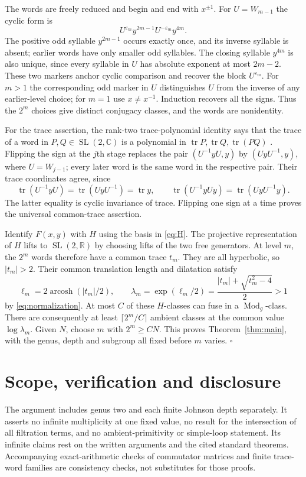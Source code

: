 \documentclass[11pt]{article}
\theoremstyle{remark}\newtheorem*{remark}{Remark}
\newcommand{\Mod}{\operatorname{Mod}}
\newcommand{\tr}{\operatorname{tr}}
\newcommand{\SL}{\operatorname{SL}}
\begin{document}
The words are freely reduced and begin and end with $x^{\pm1}$.
For $U=W_{m-1}$ the cyclic form is
\[
 U^{\varepsilon_m}y^{2m-1}U^{-\varepsilon_m}y^{4m}.
\]
The positive odd syllable $y^{2m-1}$ occurs exactly once, and its inverse
syllable is absent; earlier words have only smaller odd syllables.
The closing syllable $y^{4m}$ is also unique, since every syllable
in $U$ has absolute exponent at most $2m-2$. These two markers
anchor cyclic comparison and recover the block $U^{\varepsilon_m}$. For $m>1$ the corresponding odd marker
in $U$ distinguishes $U$ from the inverse of any earlier-level choice;
for $m=1$ use $x\ne x^{-1}$. Induction recovers all the signs.
Thus the $2^m$ choices give distinct conjugacy classes, and the words
are nonidentity.

For the trace assertion, the rank-two trace-polynomial identity says
that the trace of a word in $P,Q\in\SL(2,\mathbb C)$ is a polynomial
in $\tr P,\tr Q,\tr(PQ)$
\cite[Theorem 3.1 and Corollary 3.14]{Horowitz}.
Flipping the sign at the $j$th stage replaces the pair
$(U^{-1}yU,y)$ by $(UyU^{-1},y)$, where $U=W_{j-1}$; every later
word is the same word in the respective pair. Their trace coordinates
agree, since
\[
 \tr(U^{-1}yU)=\tr(UyU^{-1})=\tr y,\qquad
 \tr(U^{-1}yUy)=\tr(UyU^{-1}y).
\]
The latter equality is cyclic invariance of trace. Flipping one sign
at a time proves the universal common-trace assertion.

Identify $F(x,y)$ with $H$ using the basis in \eqref{eq:H}.
The projective representation of $H$ lifts to $\SL(2,\mathbb R)$ by
choosing lifts of the two free generators. At level $m$, the $2^m$
words therefore have a common trace $t_m$. They are all hyperbolic,
so $|t_m|>2$. Their common translation length and dilatation satisfy
\[
 \ell_m=2\operatorname{arcosh}(|t_m|/2),\qquad
 \lambda_m=\exp(\ell_m/2)
           =\frac{|t_m|+\sqrt{t_m^2-4}}2>1
\]
by \eqref{eq:normalization}. At most $C$ of these $H$-classes can fuse
in a $\Mod_g$-class. There are consequently at least
$\lceil2^m/C\rceil$ ambient classes at the common value
$\log\lambda_m$. Given $N$, choose $m$ with $2^m\ge CN$.
This proves Theorem~\ref{thm:main}, with the genus, depth and subgroup
all fixed before $m$ varies. \hfill$\square$

\section*{Scope, verification and disclosure}
The argument includes genus two and each finite Johnson depth
separately. It asserts no infinite multiplicity at one fixed value,
no result for the intersection of all filtration terms, and no
ambient-primitivity or simple-loop statement. Its infinite claims rest
on the written arguments and the cited standard theorems. Accompanying
exact-arithmetic checks of commutator matrices and finite trace-word
families are consistency checks, not substitutes for those proofs.
\end{document}
